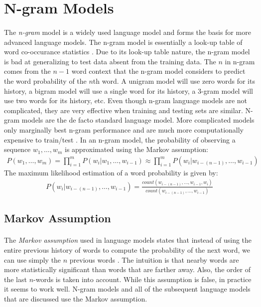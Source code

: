 \section{N-gram Models}
\paragraph{}
The \emph{n-gram} model is a widely used language model and forms the basis for more advanced language models. The n-gram model is essentially a look-up table of word co-occurance statistics \cite{Jurafsky2009}. Due to its look-up table nature, the n-gram model is bad at generalizing to test data absent from the training data. The $n$ in n-gram comes from the $n -1$ word context that the n-gram model considers to predict the word probability of the $n$th word. A unigram model will use zero words for its history, a bigram model will use a single word for its history, a 3-gram model will use two words for its history, etc.  Even though n-gram language models are not complicated, they are very effective when training and testing sets are similar. N-gram models are the de facto standard language model. More complicated models only marginally best n-gram performance and are much more computationally expensive to train/test \cite{Mikolov2012}. 
In an n-gram model, the probability of observing a sequence $w_1, \dots, w_m$ is approximated using the Markov assumption:
\begin{align}
P(w_1,\dots,w_m) = \prod^{m}_{i=1} P(w_i|w_1,\dots, w_{i-1}) \approx  \prod^{m}_{i=1} P(w_i | w_{i-(n-1)},\dots, w_{i-1}) 
\end{align}
The maximum likelihood estimation of a word probability is given by:
\begin{align}
P(w_i | w_{i-(n-1)},\dots, w_{i-1}) = \frac{count(w_{i-(n-1)},\dots,w_{i-1},w_i)}{count(w_{i-(n-1)},\dots,w_{i-1})} 
\end{align}

\subsection{Markov Assumption}
\paragraph{}
The \emph{Markov assumption} used in language models states that instead of using the entire previous history of words to compute the probability of the next word, we can use simply the $n$ previous words \cite{Jurafsky2009}. The intuition is that nearby words are more statistically significant than words that are farther away. Also, the order of the last $n$-words is taken into account. While this assumption is false, in practice it seems to work well. N-gram models and all of the subsequent language models that are discussed use the Markov assumption.
